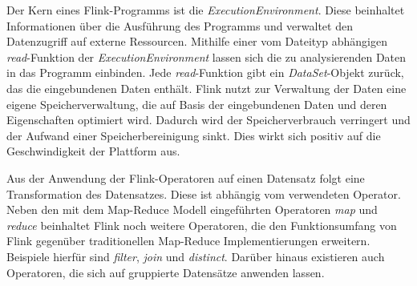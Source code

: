 
Der Kern eines Flink-Programms ist die \textit{ExecutionEnvironment}. Diese beinhaltet Informationen über die Ausführung des Programms und verwaltet den Datenzugriff auf externe Ressourcen. Mithilfe einer vom Dateityp abhängigen \textit{read}-Funktion der \textit{ExecutionEnvironment} lassen sich die zu analysierenden Daten in das Programm einbinden. Jede \textit{read}-Funktion gibt ein \textit{DataSet}-Objekt zurück, das die eingebundenen Daten enthält. Flink nutzt zur Verwaltung der Daten eine eigene Speicherverwaltung, die auf Basis der eingebundenen Daten und deren Eigenschaften optimiert wird. Dadurch wird der Speicherverbrauch verringert und der Aufwand einer Speicherbereinigung sinkt. Dies wirkt sich positiv auf die Geschwindigkeit der Plattform aus.

Aus der Anwendung der Flink-Operatoren auf einen Datensatz folgt eine Transformation des Datensatzes. Diese ist abhängig vom verwendeten Operator. Neben den mit dem Map-Reduce Modell eingeführten Operatoren \textit{map} und \textit{reduce} beinhaltet Flink noch weitere Operatoren, die den Funktionsumfang von Flink gegenüber traditionellen Map-Reduce Implementierungen erweitern. Beispiele hierfür sind \textit{filter}, \textit{join} und \textit{distinct}. Darüber hinaus existieren auch Operatoren, die sich auf gruppierte Datensätze anwenden lassen.

